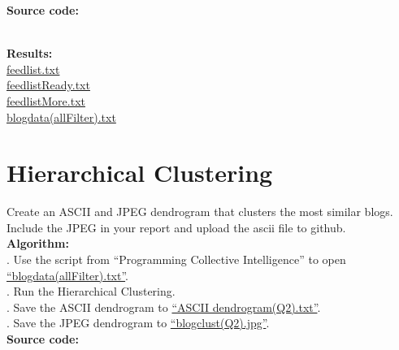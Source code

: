 \documentclass{article}
\begin{document}
		\noindent\textbf{Source code:}
		

		\noindent\\\textbf{Results:}\\
		\indent\href{https://github.com/zhangboroy/cs532-s17/blob/master/assg08_submission/feedlist.txt}{feedlist.txt}\\
		\indent\href{https://github.com/zhangboroy/cs532-s17/blob/master/assg08_submission/feedlistReady.txt}{feedlistReady.txt}\\
		\indent\href{https://github.com/zhangboroy/cs532-s17/blob/master/assg08_submission/feedlistMore.txt}{feedlistMore.txt}\\
		\indent\href{https://github.com/zhangboroy/cs532-s17/blob/master/assg08_submission/blogdata(allFilter).txt}{blogdata(allFilter).txt}\\

		\section{Hierarchical Clustering}
		Create an ASCII and JPEG dendrogram that clusters the most similar blogs. Include the JPEG in your report and upload the ascii file to github.\\

		\noindent\textbf{Algorithm:}\\
		. Use the script from ``Programming Collective Intelligence'' to open \href{https://github.com/zhangboroy/cs532-s17/blob/master/assg08_submission/blogdata(allFilter).txt}{``blogdata(allFilter).txt''}.\\
		. Run the Hierarchical Clustering.\\
		. Save the ASCII dendrogram to \href{https://github.com/zhangboroy/cs532-s17/blob/master/assg08_submission/ASCII%20dendrogram(Q2).txt}{``ASCII dendrogram(Q2).txt''}.\\
		. Save the JPEG dendrogram to \href{https://github.com/zhangboroy/cs532-s17/blob/master/assg08_submission/blogclust(Q2).jpg}{``blogclust(Q2).jpg''}.\\

		\noindent\textbf{Source code:}
		
\end{document}
